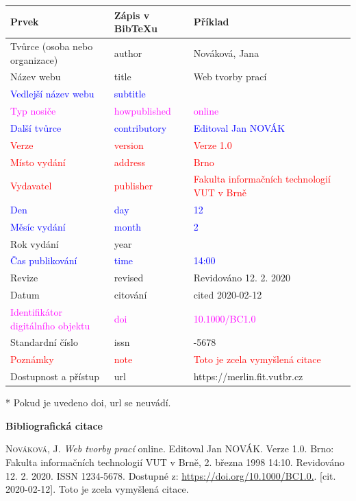 \begin{tabularx}{0.95\linewidth}{>{\raggedright\arraybackslash}X X >{\raggedright\arraybackslash}X}
   Prvek & Zápis v BibTeXu & Příklad\\\hline
   Tvůrce (osoba nebo organizace) & author & Nováková, Jana\\
   Název webu & title & Web tvorby prací\\
   \textcolor{blue}{Vedlejší název webu} &  \textcolor{blue}{subtitle} & \\
   \textcolor{magenta}{Typ nosiče} & \textcolor{magenta}{howpublished} & \textcolor{magenta}{online}\\
   \textcolor{blue}{Další tvůrce} & \textcolor{blue}{contributory} & \textcolor{blue}{Editoval Jan NOVÁK}\\
   \textcolor{red}{Verze} & \textcolor{red}{version} & \textcolor{red}{Verze 1.0}\\
   \textcolor{red}{Místo vydání} & \textcolor{red}{address} & \textcolor{red}{Brno}\\
   \textcolor{red}{Vydavatel} & \textcolor{red}{publisher} & \textcolor{red}{Fakulta informačních technologií VUT v Brně}\\
   \textcolor{blue}{Den} & \textcolor{blue}{day} & \textcolor{blue}{12}\\
   \textcolor{blue}{Měsíc vydání} & \textcolor{blue}{month} & \textcolor{blue}{2}\\
   Rok vydání & year & 2020\\
   \textcolor{blue}{Čas publikování} & \textcolor{blue}{time} & \textcolor{blue}{14:00}\\
   Revize & revised & Revidováno 12. 2. 2020\\
   Datum & citování & cited 2020-02-12\\
   \textcolor{magenta}{Identifikátor digitálního objektu} & \textcolor{magenta}{doi} & \textcolor{magenta}{10.1000/BC1.0}\\
   Standardní číslo & issn & 1234-5678\\
   \textcolor{red}{Poznámky} & \textcolor{red}{note} & \textcolor{red}{Toto je zcela vymyšlená citace}\\
   Dostupnost a přístup & url & https://merlin.fit.vutbr.cz
\end{tabularx}

\bigskip
* Pokud je uvedeno doi, url se neuvádí.

\bigskip

\noindent \textbf{Bibliografická citace}

\medskip

\noindent \textsc{Nováková}, J. \textit{Web tvorby prací} online. Editoval Jan NOVÁK. Verze 1.0. Brno: Fakulta informačních technologií VUT v Brně, 2. března 1998 14:10. Revidováno 12. 2. 2020. ISSN 1234-5678. Dostupné z: \url{https://doi.org/10.1000/BC1.0.}. [cit. 2020-02-12]. Toto je zcela vymyšlená citace.

%
